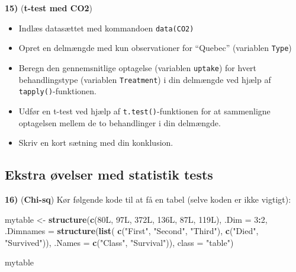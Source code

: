 \documentclass[
]{book}
\newenvironment{Shaded}{\begin{snugshade}}{\end{snugshade}}
\newcommand{\AttributeTok}[1]{\textcolor[rgb]{0.27,0.27,0.27}{#1}}
\newcommand{\DataTypeTok}[1]{\textcolor[rgb]{0.27,0.27,0.27}{#1}}
\newcommand{\DecValTok}[1]{\textcolor[rgb]{0.06,0.06,0.06}{#1}}
\newcommand{\FunctionTok}[1]{\textcolor[rgb]{0.27,0.27,0.27}{\textbf{#1}}}
\newcommand{\NormalTok}[1]{#1}
\newcommand{\OtherTok}[1]{\textcolor[rgb]{0.37,0.37,0.37}{#1}}
\newcommand{\SpecialCharTok}[1]{\textcolor[rgb]{0.43,0.43,0.43}{\textbf{#1}}}
\newcommand{\StringTok}[1]{\textcolor[rgb]{0.5,0.5,0.5}{#1}}
\providecommand{\tightlist}{%
  \setlength{\itemsep}{0pt}\setlength{\parskip}{0pt}}
\begin{document}
\textbf{15)} (\textbf{t-test med CO2})

\begin{itemize}
\tightlist
\item
  Indlæs datasættet med kommandoen \texttt{data(CO2)}
\item
  Opret en delmængde med kun observationer for ``Quebec'' (variablen \texttt{Type})
\item
  Beregn den gennemsnitlige optagelse (variablen \texttt{uptake}) for hvert behandlingstype (variablen \texttt{Treatment}) i din delmængde ved hjælp af \texttt{tapply()}-funktionen.
\item
  Udfør en t-test ved hjælp af \texttt{t.test()}-funktionen for at sammenligne optagelsen mellem de to behandlinger i din delmængde.
\item
  Skriv en kort sætning med din konklusion.
\end{itemize}

\subsection{Ekstra øvelser med statistik tests}\label{ekstra-uxf8velser-med-statistik-tests}

\textbf{16)} (\textbf{Chi-sq}) Kør følgende kode til at få en tabel (selve koden er ikke vigtigt):

\begin{Shaded}
\begin{Highlighting}[]
\NormalTok{mytable }\OtherTok{\textless{}{-}} \FunctionTok{structure}\NormalTok{(}\FunctionTok{c}\NormalTok{(}\DecValTok{80}\DataTypeTok{L}\NormalTok{, }\DecValTok{97}\DataTypeTok{L}\NormalTok{, }\DecValTok{372}\DataTypeTok{L}\NormalTok{, }\DecValTok{136}\DataTypeTok{L}\NormalTok{, }\DecValTok{87}\DataTypeTok{L}\NormalTok{, }\DecValTok{119}\DataTypeTok{L}\NormalTok{), }\AttributeTok{.Dim =} \DecValTok{3}\SpecialCharTok{:}\DecValTok{2}\NormalTok{, }\AttributeTok{.Dimnames =} \FunctionTok{structure}\NormalTok{(}\FunctionTok{list}\NormalTok{(}
    \FunctionTok{c}\NormalTok{(}\StringTok{"First"}\NormalTok{, }\StringTok{"Second"}\NormalTok{, }\StringTok{"Third"}\NormalTok{), }\FunctionTok{c}\NormalTok{(}\StringTok{"Died"}\NormalTok{, }\StringTok{"Survived"}\NormalTok{)), }\AttributeTok{.Names =} \FunctionTok{c}\NormalTok{(}\StringTok{"Class"}\NormalTok{, }\StringTok{"Survival"}\NormalTok{)), }\AttributeTok{class =} \StringTok{"table"}\NormalTok{)}

\NormalTok{mytable}
\end{Highlighting}
\end{Shaded}
\end{document}
